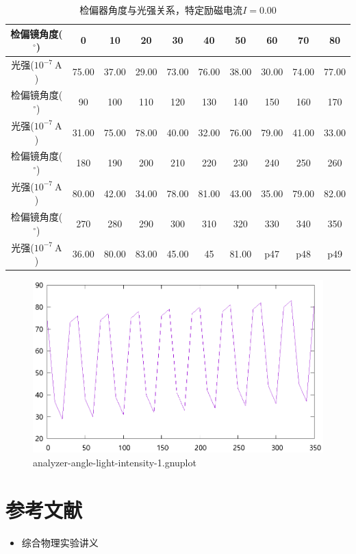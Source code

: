 \documentclass{ctexart}
\newcommand{\si}[1]{\  \mathrm{#1}}
\begin{document}
    \begin{table}[H]
      \centering
      \begin{tabular}{|c|c|c|c|c|c|c|c|c|c|}
        \hline
        检偏镜角度(${}^{\circ}$) & 0 & 10 & 20 & 30 & 40 & 50 & 60 & 70 & 80 \\\hline
        光强($10^{-7} \si{A}$)  & 75.00 & 37.00 & 29.00 & 73.00 & 76.00 & 38.00 & 30.00 & 74.00 & 77.00 \\\hline
        检偏镜角度(${}^{\circ}$) & 90 & 100 & 110 & 120 & 130 & 140 & 150 & 160 & 170 \\\hline
        光强($10^{-7} \si{A}$)  & 31.00 & 75.00 & 78.00 & 40.00 & 32.00 & 76.00 & 79.00 & 41.00 & 33.00 \\\hline
        检偏镜角度(${}^{\circ}$) & 180 & 190 & 200 & 210 & 220 & 230 & 240 & 250 & 260  \\\hline
        光强($10^{-7} \si{A}$)  & 80.00 & 42.00 & 34.00 & 78.00 & 81.00 & 43.00 & 35.00 & 79.00 & 82.00 \\\hline
        检偏镜角度(${}^{\circ}$) & 270 & 280 & 290 & 300 & 310 & 320 & 330 & 340 & 350 \\\hline
        光强($10^{-7} \si{A}$)  & 36.00 & 80.00 & 83.00 & 45.00 & 45 & 81.00 & p47 & p48 & p49 \\\hline
      \end{tabular}
      \caption{检偏器角度与光强关系，特定励磁电流$I=0.00$}
    \end{table}

    \begin{figure}[H]
      \centering
      \includegraphics[width=\linewidth]{../output/analyzer-angle-light-intensity-1.gnuplot}
      \caption{analyzer-angle-light-intensity-1.gnuplot}
      \label{fig:analyzer-angle-light-intensity-1.gnuplot}
    \end{figure}
    \section{参考文献}
    \begin{itemize}[leftmargin=0pt]
        \item[] 综合物理实验讲义
    \end{itemize}
\end{document}

